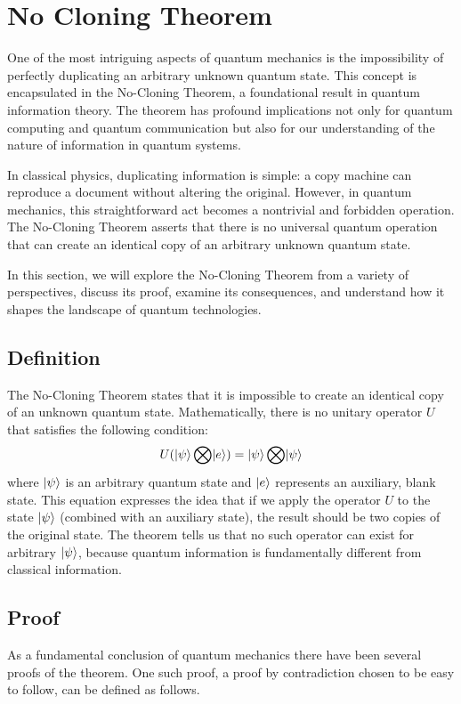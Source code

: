 \section{No Cloning Theorem} \label{sec:no-cloning}
One of the most intriguing aspects of quantum mechanics is the impossibility of
perfectly duplicating an arbitrary unknown quantum state.
This concept is encapsulated in the No-Cloning Theorem, a foundational result in quantum information theory.
The theorem has profound implications not only for quantum computing and quantum communication
but also for our understanding of the nature of information in quantum systems.

In classical physics, duplicating information is simple:
a copy machine can reproduce a document without altering the original.
However, in quantum mechanics, this straightforward act becomes a nontrivial and forbidden operation.
The No-Cloning Theorem asserts that there is no universal quantum operation
that can create an identical copy of an arbitrary unknown quantum state.

In this section, we will explore the No-Cloning Theorem from a variety of perspectives, discuss its proof,
examine its consequences, and understand how it shapes the landscape of quantum technologies.
\subsection{Definition}\label{subsec:definition}
The No-Cloning Theorem states that it is impossible to create an identical copy of an unknown quantum state.
Mathematically, there is no unitary operator $U$ that satisfies the following condition:
\begin{equation}
    U(\lvert\psi\rangle\bigotimes\lvert e\rangle)=\lvert\psi\rangle\bigotimes\lvert\psi\rangle\label {eq:cloning_assertion}
\end{equation}
where $\lvert\psi\rangle$ is an arbitrary quantum state and
$\lvert e\rangle$ represents an auxiliary, blank state.
This equation expresses the idea that if we apply the operator $U$ to the state $\lvert\psi\rangle$
(combined with an auxiliary state), the result should be two copies of the original state.
The theorem tells us that no such operator can exist for arbitrary $\lvert\psi\rangle$,
because quantum information is fundamentally different from classical information.
\subsection{Proof}\label{subsec:proof}
As a fundamental conclusion of quantum mechanics there have been several proofs of the theorem.
One such proof, a proof by contradiction chosen to be easy to follow, can be defined as follows.

